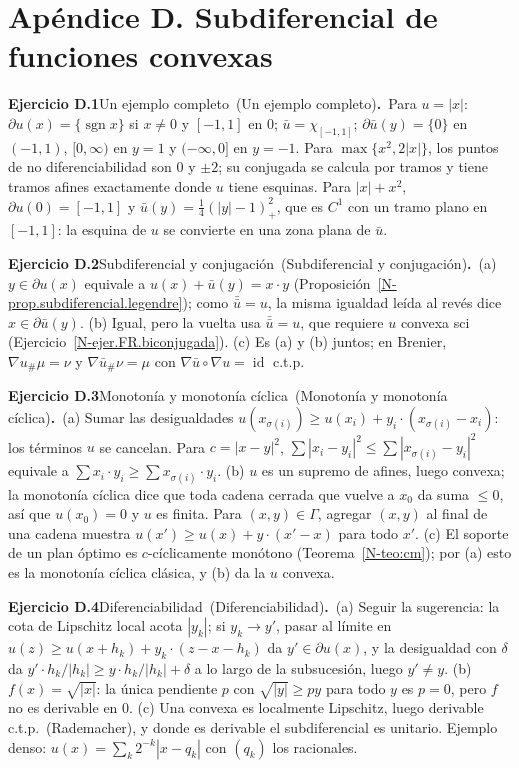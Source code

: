 \documentclass[11pt,a4paper]{amsart}
\newcommand{\id}{\operatorname{id}}
\theoremstyle{remark}
\theoremstyle{definition}
\numberwithin{subsection}{section}
\numberwithin{equation}{section}
\newcommand{\ejlabel}[2]{\par\medskip\noindent\textbf{Ejercicio #1}\ifx\relax#2\relax\else\ (#2)\fi\textbf{.}\ }
\begin{document}
\section*{Apéndice D. Subdiferencial de funciones convexas}
\ejlabel{D.1}{Un ejemplo completo}Para $u=|x|$: $\partial u(x)=\{\operatorname{sgn}x\}$ si $x\ne0$ y $[-1,1]$ en $0$; $\bar u=\chi_{[-1,1]}$; $\partial\bar u(y)=\{0\}$ en $(-1,1)$, $[0,\infty)$ en $y=1$ y $(-\infty,0]$ en $y=-1$. Para $\max\{x^2,2|x|\}$, los puntos de no diferenciabilidad son $0$ y $\pm2$; su conjugada se calcula por tramos y tiene tramos afines exactamente donde $u$ tiene esquinas. Para $|x|+x^2$, $\partial u(0)=[-1,1]$ y $\bar u(y)=\frac14(|y|-1)_+^2$, que es $C^1$ con un tramo plano en $[-1,1]$: la esquina de $u$ se convierte en una zona plana de $\bar u$.

\ejlabel{D.2}{Subdiferencial y conjugación}(a) $y\in\partial u(x)$ equivale a $u(x)+\bar u(y)=x\cdot y$ (Proposición~\ref{N-prop.subdiferencial.legendre}); como $\bar{\bar u}=u$, la misma igualdad leída al revés dice $x\in\partial\bar u(y)$. (b) Igual, pero la vuelta usa $\bar{\bar u}=u$, que requiere $u$ convexa sci (Ejercicio~\ref{N-ejer.FR.biconjugada}). (c) Es (a) y (b) juntos; en Brenier, $\nabla u_\#\mu=\nu$ y $\nabla\bar u_\#\nu=\mu$ con $\nabla\bar u\circ\nabla u=\id$ c.t.p.

\ejlabel{D.3}{Monotonía y monotonía cíclica}(a) Sumar las desigualdades $u(x_{\sigma(i)})\ge u(x_i)+y_i\cdot(x_{\sigma(i)}-x_i)$: los términos $u$ se cancelan. Para $c=|x-y|^2$, $\sum|x_i-y_i|^2\le\sum|x_{\sigma(i)}-y_i|^2$ equivale a $\sum x_i\cdot y_i\ge\sum x_{\sigma(i)}\cdot y_i$. (b) $u$ es un supremo de afines, luego convexa; la monotonía cíclica dice que toda cadena cerrada que vuelve a $x_0$ da suma $\le0$, así que $u(x_0)=0$ y $u$ es finita. Para $(x,y)\in\Gamma$, agregar $(x,y)$ al final de una cadena muestra $u(x')\ge u(x)+y\cdot(x'-x)$ para todo $x'$. (c) El soporte de un plan óptimo es $c$-cíclicamente monótono (Teorema~\ref{N-teo:cm}); por (a) esto es la monotonía cíclica clásica, y (b) da la $u$ convexa.

\ejlabel{D.4}{Diferenciabilidad}(a) Seguir la sugerencia: la cota de Lipschitz local acota $|y_k|$; si $y_k\to y'$, pasar al límite en $u(z)\ge u(x+h_k)+y_k\cdot(z-x-h_k)$ da $y'\in\partial u(x)$, y la desigualdad con $\delta$ da $y'\cdot h_k/|h_k|\ge y\cdot h_k/|h_k|+\delta$ a lo largo de la subsucesión, luego $y'\ne y$. (b) $f(x)=\sqrt{|x|}$: la única pendiente $p$ con $\sqrt{|y|}\ge py$ para todo $y$ es $p=0$, pero $f$ no es derivable en $0$. (c) Una convexa es localmente Lipschitz, luego derivable c.t.p.\ (Rademacher), y donde es derivable el subdiferencial es unitario. Ejemplo denso: $u(x)=\sum_k2^{-k}|x-q_k|$ con $(q_k)$ los racionales.
\end{document}
